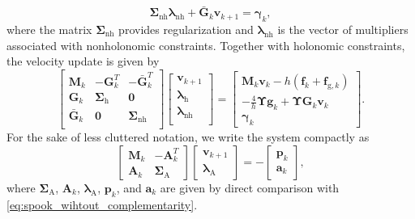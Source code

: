 \documentclass[preprint,12pt]{elsarticle}
\let\vec\bm
\let\mat\mathbf
\numberwithin{equation}{section}
\def\jaca{\mat{A}}
\def\tA{\text{A}}
\def\tg{\text{g}}
\def\th{\text{h}}
\def\lambdanh{\vec{\lambda}_{\text{nh}}}
\begin{document}
\begin{equation}
    \label{eq:nonholonomic_disc}
    \mat{\Sigma}_\text{nh} \lambdanh + \bar{\mat{G}}_k \vec{v}_{k+1}= \vec{\gamma}_k,
\end{equation}
where the matrix $\mat{\Sigma}_\text{nh}$ provides regularization and  $\lambdanh$ is the vector of multipliers associated with nonholonomic constraints.
Together with holonomic constraints, the velocity update is given by
\begin{equation}
    \label{eq:spook_wihtout_complementarity}
    \begin{bmatrix}
        \mat{M}_k & -\mat{G}_k^T & -\bar{\mat{G}}_k^T    \\
        \mat{G}_k   & \mat{\Sigma}_\th & \mat{0} \\
        \bar{\mat{G}}_k & \mat{0} & \mat{\Sigma}_\text{nh} \\
    \end{bmatrix}
    \begin{bmatrix}
        \vec{v}_{k+1} \\
        \vec{\lambda}_\th \\
        \vec{\lambda}_\text{nh} \\
    \end{bmatrix}
        =
    \begin{bmatrix}
        \mat{M}_k \vec{v}_k - h (\vec{f}_k + \vec{f}_{\tg,k}) \\
        -\frac{4}{h} \vec{\Upsilon} \vec{g}_k + \vec{\Upsilon} \mat{G}_k \vec{v}_k \\
        \vec{\gamma}_k
    \end{bmatrix}.
\end{equation}
For the sake of less cluttered notation, we write the system compactly as
\begin{equation}
    \label{eq:spook_wihtout_complementarity_compact}
    \begin{bmatrix}
        \mat{M}_k & -\jaca_k^T     \\
        \jaca_k   & \mat{\Sigma}_\tA
    \end{bmatrix}
    \begin{bmatrix}
        \vec{v}_{k+1} \\
        \vec{\lambda}_\tA
    \end{bmatrix}
    =
    -\begin{bmatrix}
        \vec{p}_k \\
        \vec{a}_k
    \end{bmatrix},
\end{equation}
where $\mat{\Sigma}_\tA$, $\mat{A}_k$, $\vec{\lambda}_\tA$, $\vec{p}_k$, and $\vec{a}_k$ are given by direct comparison with \eqref{eq:spook_wihtout_complementarity}.
\end{document}
